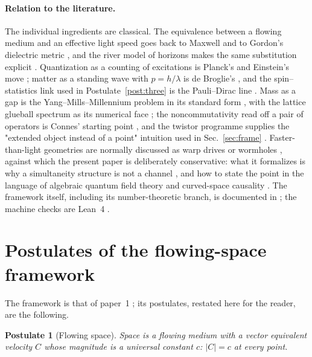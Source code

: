 \documentclass[aps,prd,preprint,superscriptaddress,amsmath,amssymb]{revtex4-2}
\newtheorem{postulate}{Postulate}[section]
\begin{document}
\paragraph{Relation to the literature.}
The individual ingredients are classical.  The equivalence between a
flowing medium and an effective light speed goes back to Maxwell and to
Gordon's dielectric metric \cite{maxwell1996dynamical,gordon1923lichtfortpflanzung},
and the river model of horizons makes the same substitution
explicit \cite{hamilton2008river}.  Quantization as a counting of
excitations is Planck's and Einstein's move
\cite{planck1978gesetz,einstein1905erzeugung,einstein1915feldgleichungen};
matter as a standing wave with $p=h/\lambda$ is de Broglie's
\cite{de1924recherches}, and the spin--statistics link used in
Postulate~\ref{post:three} is the Pauli--Dirac line
\cite{pauli1925zusammenhang,dirac1928quantum,heisenberg1927anschaulichen}.
Mass as a gap is the Yang--Mills--Millennium problem in its standard form
\cite{yang1954conservation,jaffe2000yang}, with the lattice glueball
spectrum as its numerical face
\cite{morningstar1999glueball,chen2006glueball,besiii2026lightest}; the
noncommutativity read off a pair of operators is Connes' starting point
\cite{connes1994ncg}, and the twistor programme supplies the "extended
object instead of a point" intuition used in Sec.~\ref{sec:frame}
\cite{penrose1967twistor}.  Faster-than-light geometries are normally
discussed as warp drives or wormholes \cite{alcubierre1994warp,morris1988wormholes},
against which the present paper is deliberately conservative: what it
formalizes is why a simultaneity structure is not a channel
\cite{bell1964einstein,aspect1982experimental}, and how to state the
point in the language of algebraic quantum field theory and curved-space
causality \cite{weinberg1995quantum,wald1994quantum}.  The framework
itself, including its number-theoretic branch, is documented in
\cite{liu2026cosmic,liu2026yangmills,ProjectionPhysics}; the machine
checks are Lean~4 \cite{de2015lean}.

\section{Postulates of the flowing-space framework}
\label{sec:postulates}

The framework is that of paper~1 \cite{ProjectionPhysics}; its
postulates, restated here for the reader, are the following.

\begin{postulate}[Flowing space]
\label{post:flowing}
Space is a flowing medium with a vector equivalent velocity $C$ \cite{liu2026cosmic,ProjectionPhysics} whose
magnitude is a universal constant $c$: $|C|=c$ at every point.
\end{postulate}
\end{document}
